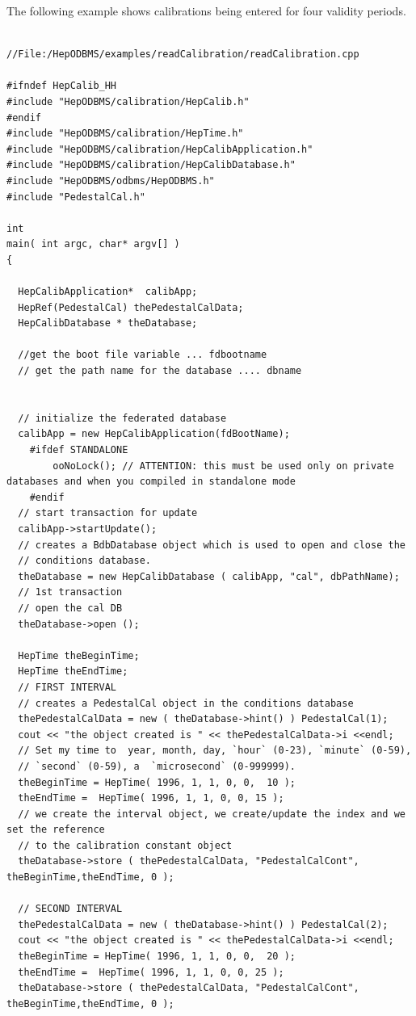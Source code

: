 The following example shows calibrations being entered for four validity periods.
\begin{verbatim}

//File:/HepODBMS/examples/readCalibration/readCalibration.cpp 

#ifndef HepCalib_HH 
#include "HepODBMS/calibration/HepCalib.h" 
#endif 
#include "HepODBMS/calibration/HepTime.h" 
#include "HepODBMS/calibration/HepCalibApplication.h" 
#include "HepODBMS/calibration/HepCalibDatabase.h" 
#include "HepODBMS/odbms/HepODBMS.h" 
#include "PedestalCal.h" 

int 
main( int argc, char* argv[] ) 
{ 
  
  HepCalibApplication*  calibApp; 
  HepRef(PedestalCal) thePedestalCalData; 
  HepCalibDatabase * theDatabase; 

  //get the boot file variable ... fdbootname 
  // get the path name for the database .... dbname 
  

  // initialize the federated database 
  calibApp = new HepCalibApplication(fdBootName); 
    #ifdef STANDALONE 
        ooNoLock(); // ATTENTION: this must be used only on private databases and when you compiled in standalone mode 
    #endif 
  // start transaction for update 
  calibApp->startUpdate(); 
  // creates a BdbDatabase object which is used to open and close the 
  // conditions database. 
  theDatabase = new HepCalibDatabase ( calibApp, "cal", dbPathName); 
  // 1st transaction 
  // open the cal DB 
  theDatabase->open (); 

  HepTime theBeginTime; 
  HepTime theEndTime;   
  // FIRST INTERVAL 
  // creates a PedestalCal object in the conditions database 
  thePedestalCalData = new ( theDatabase->hint() ) PedestalCal(1); 
  cout << "the object created is " << thePedestalCalData->i <<endl; 
  // Set my time to  year, month, day, `hour` (0-23), `minute` (0-59), 
  // `second` (0-59), a  `microsecond` (0-999999). 
  theBeginTime = HepTime( 1996, 1, 1, 0, 0,  10 ); 
  theEndTime =  HepTime( 1996, 1, 1, 0, 0, 15 ); 
  // we create the interval object, we create/update the index and we set the reference 
  // to the calibration constant object 
  theDatabase->store ( thePedestalCalData, "PedestalCalCont", theBeginTime,theEndTime, 0 ); 
  
  // SECOND INTERVAL 
  thePedestalCalData = new ( theDatabase->hint() ) PedestalCal(2); 
  cout << "the object created is " << thePedestalCalData->i <<endl; 
  theBeginTime = HepTime( 1996, 1, 1, 0, 0,  20 ); 
  theEndTime =  HepTime( 1996, 1, 1, 0, 0, 25 ); 
  theDatabase->store ( thePedestalCalData, "PedestalCalCont", theBeginTime,theEndTime, 0 ); 
  

\end{verbatim}
